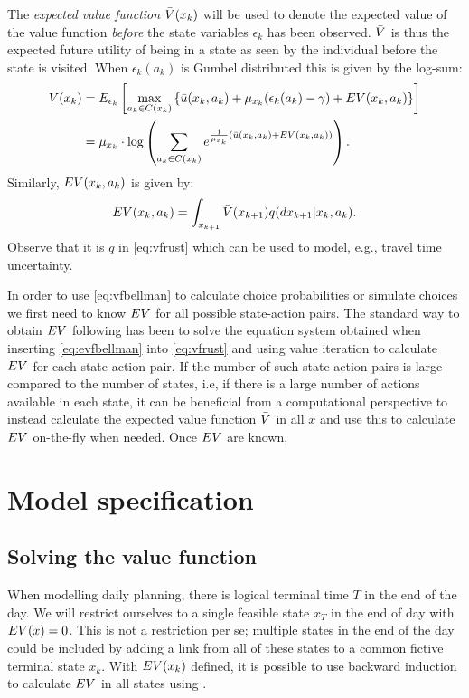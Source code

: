The \emph{expected value function} $\bar{V}(x_k)$ will be used to denote the expected value of the value function \emph{before} the state variables $\epsilon_k$ has been observed. $\bar{V}$ is thus the expected future utility of being in a state as seen by the individual before the state is visited. When $\epsilon_k(a_k)$ is Gumbel distributed this is given by the log-sum:
\begin{equation} \label{eq:evfbellman}
\begin{aligned}
\ev(x_k) &= E_{\epsilon_k} \left[ \max_{{a_k}\in C(x_{k})} \left\{\bar{u}(x_k,a_k) + \mu_{x_k} (\epsilon_k(a_k)-\gamma)+ \eutil(x_k,a_k) \right\}  \right] \\&= \mu_{x_k}\cdot\log\left(\sum_{a_k\in C(x_{k})} e^{\frac{1}{\mu_{x_k}}\left(\bar{u}(x_k,a_k) + \eutil(x_k,a_k)\right)}\right).
\end{aligned}
\end{equation}
Similarly, $EV(x_k,a_k)$ is given by:
\begin{equation} \label{eq:vfrust}
    \eutil(x_k,a_k) = \int_{x_{k+1}} \ev(x_{k+1})q(dx_{k+1}|x_k,a_k).
\end{equation}
Observe that it is $q$ in \eqref{eq:vfrust} which can be used to model, e.g., travel time uncertainty.  

In order to use \eqref{eq:vfbellman} to calculate choice probabilities or simulate choices we first need to know $EV$ for all possible state-action pairs.  
The standard way to obtain $EV$ following \citet{Rust87} has been to solve the equation system obtained when inserting \eqref{eq:evfbellman} into \eqref{eq:vfrust} and using value iteration to calculate $EV$ for each state-action pair.   
If the number of such state-action pairs is large compared to the number of states, i.e, if there is a large number of actions available in each state, it can be beneficial from a computational perspective to instead calculate the expected value function $\bar{V}$ in all $x$ and use this to calculate $EV$ on-the-fly when needed. Once $EV$ are known, 



\section{Model specification}




\subsection{Solving the value function}
When modelling daily planning, there is logical terminal time $T$ in the end of the day. We will restrict ourselves to a single feasible state $x_T$ in the end of day with $EV(x) = 0$. This is not a restriction per se; multiple states in the end of the day could be included by adding a link from all of these states to a common fictive terminal state $x_k$. With $EV(x_k)$ defined, it is possible to use backward induction to calculate $EV$ in all states using .


